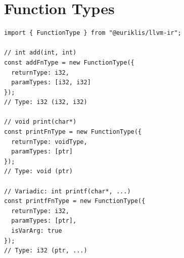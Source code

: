 \section{Function Types}

\begin{lstlisting}[style=ts]
import { FunctionType } from "@euriklis/llvm-ir";

// int add(int, int)
const addFnType = new FunctionType({
  returnType: i32,
  paramTypes: [i32, i32]
});
// Type: i32 (i32, i32)

// void print(char*)
const printFnType = new FunctionType({
  returnType: voidType,
  paramTypes: [ptr]
});
// Type: void (ptr)

// Variadic: int printf(char*, ...)
const printfFnType = new FunctionType({
  returnType: i32,
  paramTypes: [ptr],
  isVarArg: true
});
// Type: i32 (ptr, ...)
\end{lstlisting}

